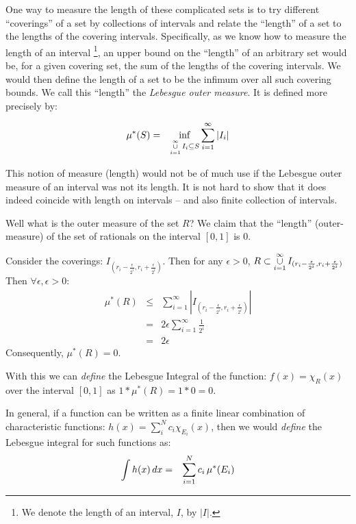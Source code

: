 \documentclass{article}
\begin{document}
One way to measure the length of these complicated sets is to try different ``coverings'' 
of a set by collections of intervals and relate the ``length'' of a set to the lengths of
the covering intervals. Specifically, as
we know how to measure the length of an interval%
\footnote{We denote the length of an interval, $I$, by $|I|$.}, an upper bound on 
the ``length'' of an arbitrary set would be, for a given covering set, 
the sum of the lengths of the covering intervals.
We would then define the length of a set to be the infimum over all such covering bounds.
We call this ``length'' the {\em Lebesgue outer measure\/}. It is defined more precisely by:

\begin{eqnarray}
	\mu^*(S) & = & \inf_{\mathop{\cup}_{i=1}^\infty\limits I_i \subseteq S} \sum_{i=1}^\infty |I_i| 
\end{eqnarray}

This notion of measure (length) would not be of much use if the Lebesgue outer measure of
an interval was not its length.
It is not hard to show that it does indeed coincide with length on 
intervals -- and also finite collection of intervals.

Well what is the outer measure of the set $R$? We claim that the ``length'' 
(outer-measure) of the set of rationals on the interval $[0,1]$ is $0$.

Consider the coverings: $I_{(r_i - \frac{\epsilon}{2^i}, r_i + \frac{\epsilon}{2^i})}$. 
Then for any
$\epsilon > 0$, $R \subset \mathop{\cup}_{i=1}^\infty\limits I_{(r_i - \frac{\epsilon}{2^i}, r_i + \frac{\epsilon}{2^i})}$
Then $\forall \epsilon, \epsilon > 0$:
\begin{eqnarray}
\mu^*(R) & \le & \sum_{i=1}^\infty  |I_{(r_i - \frac{\epsilon}{2^i}, r_i + \frac{\epsilon}{2^i})}| \\
		 & = & 2 \epsilon \sum_{i=1}^\infty \frac{1}{2^i} \\
		 & = & 2 \epsilon
\end{eqnarray}
Consequently, $\mu^*(R) = 0$. 

With this we can {\em define\/} the Lebesgue Integral of the function: 
$f(x) = \chi_{R}(x)$ over the interval $[0,1]$ 
as $1 * \mu^*(R) = 1 * 0 = 0$.

In general, if a function can be written as a finite linear combination of 
characteristic functions: $h(x) = \sum_i^N c_i \chi_{E_i}(x)$,
then we would {\em define\/} the Lebesgue integral for such functions as:
\begin{eqnarray}
	\int h(x) \, dx & = & \sum_{i=1}^N\limits c_i \, \mu^*(E_i)
\end{eqnarray}
\end{document}
